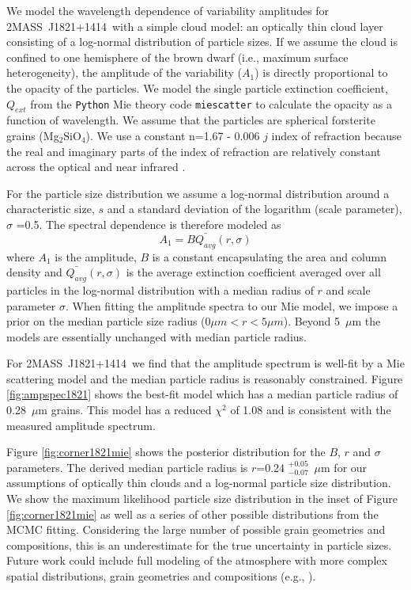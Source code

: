 \documentclass[twocolumn]{aastex6}
\newcommand{\sha}{2MASS~J0835$-$0819}
\newcommand{\shb}{2MASS~J1821+1414}
\begin{document}
We model the wavelength dependence of variability amplitudes for \shb\ with a simple cloud model: an optically thin cloud layer consisting of a log-normal distribution of particle sizes.
If we assume the cloud is confined to one hemisphere of the brown dwarf (i.e., maximum surface heterogeneity), the amplitude of the variability ($A_1$) is directly proportional to the opacity of the particles.
We model the single particle extinction coefficient, $Q_{ext}$ from the \texttt{Python} Mie theory code \texttt{miescatter} \citep{bohren1983mie} to calculate the opacity as a function of wavelength.
We assume that the particles are spherical forsterite grains (Mg$_2$SiO$_4$).
We use a constant n=1.67 - 0.006 $j$ index of refraction because the real and imaginary parts of the index of refraction are relatively constant across the optical and near infrared \citep{scott1996forsterite}.


For the particle size distribution we assume a log-normal distribution around a characteristic size, $s$ and a standard deviation of the logarithm (scale parameter), $\sigma$ =0.5.
The spectral dependence is therefore modeled as 
\begin{equation}
A_1 = B \bar{Q_{avg}}(r,\sigma)
\end{equation}
where $A_1$ is the amplitude, $B$ is a constant encapsulating the area and column density and $\bar{Q_{avg}}(r,\sigma)$ is the average extinction coefficient averaged over all particles in the log-normal distribution with a median radius of $r$ and scale parameter $\sigma$.
When fitting the amplitude spectra to our Mie model, we impose a prior on the median particle size radius ($0 \mu m < r < 5 \mu m$).
Beyond 5~$\mu$m the models are essentially unchanged with median particle radius.

For \shb\ we find that the amplitude spectrum is well-fit by a Mie scattering model and the median particle radius is reasonably constrained.
Figure \ref{fig:ampspec1821} shows the best-fit model which has a median particle radius of 0.28~$\mu$m grains.
This model has a reduced $\chi^2$ of 1.08 and is consistent with the measured amplitude spectrum.

Figure \ref{fig:corner1821mie} shows the posterior distribution for the $B$, $r$ and $\sigma$ parameters.
The derived median particle radius is $r$=0.24 $^{+0.05}_{-0.07}$~$\mu$m for our assumptions of optically thin clouds and a log-normal particle size distribution.
We show the maximum likelihood particle size distribution in the inset of Figure \ref{fig:corner1821mie} as well as a series of other possible distributions from the MCMC fitting.
Considering the large number of possible grain geometries and compositions, this is an underestimate for the true uncertainty in particle sizes.
Future work could include full modeling of the atmosphere with more complex spatial distributions, grain geometries and compositions (e.g., \citealt{2008ApJ...675L.105H}).
\end{document}

